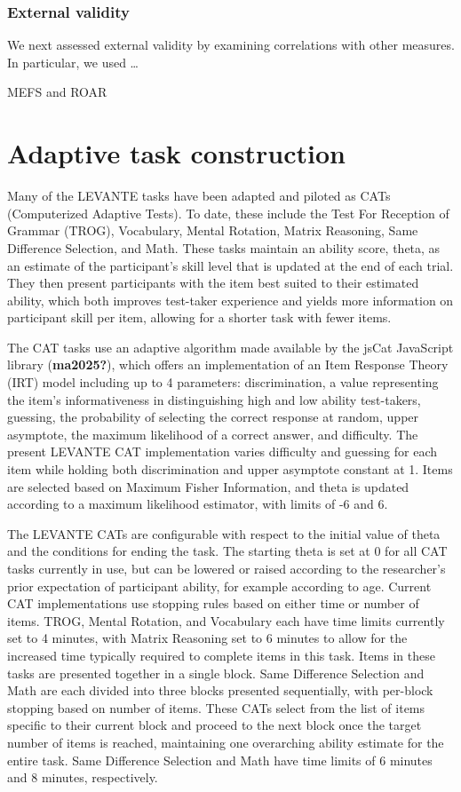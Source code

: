\documentclass[
  english,
  man]{apa6}
\begin{document}
\subsubsection{External validity}\label{external-validity}

We next assessed external validity by examining correlations with other measures. In particular, we used \ldots{}

MEFS and ROAR

\section{Adaptive task construction}\label{adaptive-task-construction}

Many of the LEVANTE tasks have been adapted and piloted as CATs (Computerized Adaptive Tests). To date, these include the Test For Reception of Grammar (TROG), Vocabulary, Mental Rotation, Matrix Reasoning, Same Difference Selection, and Math. These tasks maintain an ability score, theta, as an estimate of the participant's skill level that is updated at the end of each trial. They then present participants with the item best suited to their estimated ability, which both improves test-taker experience and yields more information on participant skill per item, allowing for a shorter task with fewer items.

The CAT tasks use an adaptive algorithm made available by the jsCat JavaScript library (\textbf{ma2025?}), which offers an implementation of an Item Response Theory (IRT) model including up to 4 parameters: discrimination, a value representing the item's informativeness in distinguishing high and low ability test-takers, guessing, the probability of selecting the correct response at random, upper asymptote, the maximum likelihood of a correct answer, and difficulty. The present LEVANTE CAT implementation varies difficulty and guessing for each item while holding both discrimination and upper asymptote constant at 1. Items are selected based on Maximum Fisher Information, and theta is updated according to a maximum likelihood estimator, with limits of -6 and 6.

The LEVANTE CATs are configurable with respect to the initial value of theta and the conditions for ending the task. The starting theta is set at 0 for all CAT tasks currently in use, but can be lowered or raised according to the researcher's prior expectation of participant ability, for example according to age. Current CAT implementations use stopping rules based on either time or number of items. TROG, Mental Rotation, and Vocabulary each have time limits currently set to 4 minutes, with Matrix Reasoning set to 6 minutes to allow for the increased time typically required to complete items in this task. Items in these tasks are presented together in a single block. Same Difference Selection and Math are each divided into three blocks presented sequentially, with per-block stopping based on number of items. These CATs select from the list of items specific to their current block and proceed to the next block once the target number of items is reached, maintaining one overarching ability estimate for the entire task. Same Difference Selection and Math have time limits of 6 minutes and 8 minutes, respectively.
\end{document}
